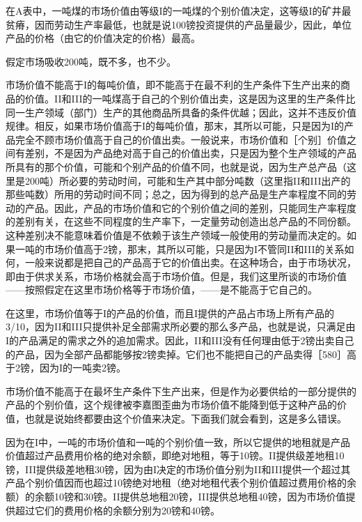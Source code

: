 
在A表中，一吨煤的市场价值由等级I的一吨煤的个别价值决定，这等级I的矿井最贫瘠，因而劳动生产率最低，也就是说100镑投资提供的产品量最少，因此，单位产品的价格（由它的价值决定的价格）最高。

假定市场吸收200吨，既不多，也不少。

市场价值不能高于I的每吨价值，即不能高于在最不利的生产条件下生产出来的商品的价值。II和III的一吨煤高于自己的个别价值出卖，这是因为这里的生产条件比同一生产领域（部门）生产的其他商品所具备的条件优越；因此，这并不违反价值规律。相反，如果市场价值高于I的每吨价值，那末，其所以可能，只是因为I的产品完全不顾市场价值高于自己的价值出卖。一般说来，市场价值和［个别］价值之间有差别，不是因为产品绝对高于自己的价值出卖，只是因为整个生产领域的产品所具有的那个价值，可能和个别产品的价值不同，也就是说，因为生产总产品（这里是200吨）所必要的劳动时间，可能和生产其中部分吨数（这里指II和III出产的那些吨数）所用的劳动时间不同；总之，因为得到的总产品是生产率程度不同的劳动的产品。因此，产品的市场价值和它的个别价值之间的差别，只能同生产率程度的差别有关，在这些不同程度的生产率下，一定量劳动创造出总产品的不同份额。这种差别决不能意味着价值是不依赖于该生产领域一般使用的劳动量而决定的。如果一吨的市场价值高于2镑，那末，其所以可能，只是因为I不管同II和III的关系如何，一般来说都是把自己的产品高于它的价值出卖。在这种场合，由于市场状况，即由于供求关系，市场价格就会高于市场价值。但是，我们这里所谈的市场价值——按照假定在这里市场价格等于市场价值，——是不能高于它自己的。

\todo{}

在这里，市场价值等于I的产品的价值，而且I提供的产品占市场上所有产品的3/10，因为II和III只提供补足全部需求所必要的那么多产品，也就是说，只满足由I的产品满足的需求之外的追加需求。因此，II和III没有任何理由低于2镑出卖自己的产品，因为全部产品都能够按2镑卖掉。它们也不能把自己的产品卖得［580］高于2镑，因为I的一吨卖2镑。

市场价值不能高于在最坏生产条件下生产出来，但是作为必要供给的一部分提供的产品的个别价值，这个规律被李嘉图歪曲为市场价值不能降到低于这种产品的价值，也就是说始终都要由这个价值来决定。下面我们就会看到，这是多么错误。

因为在I中，一吨的市场价值和一吨的个别价值一致，所以它提供的地租就是产品价值超过产品费用价格的绝对余额，即绝对地租，等于10镑。II提供级差地租10镑，III提供级差地租30镑，因为由I决定的市场价值分别为II和III提供一个超过其产品个别价值因而也超过10镑绝对地租（绝对地租代表个别价值超过费用价格的余额）的余额10镑和30镑。II提供总地租20镑，III提供总地租40镑，因为市场价值提供超过它们的费用价格的余额分别为20镑和40镑。

